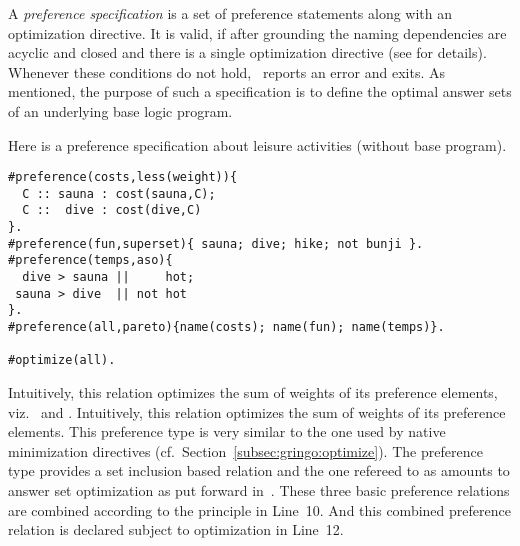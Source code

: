 A \emph{preference specification} is a set of preference statements along with an optimization directive.
It is valid, if after grounding the naming dependencies are acyclic and closed
and there is a single optimization directive
(see \cite{brderosc15a} for details).
Whenever these conditions do not hold, \asprin\ reports an error and exits.
%
As mentioned,
the purpose of such a specification is to define the optimal answer sets of an underlying base logic program.

\begin{example}\label{asprin:example3}
Here is %
a {preference specification} about leisure activities (without base program).
\begin{lstlisting}[escapechar=?]
#preference(costs,less(weight)){ 
  C :: sauna : cost(sauna,C); 
  C ::  dive : cost(dive,C) 
}.
#preference(fun,superset){ sauna; dive; hike; not bunji }.
#preference(temps,aso){
  dive > sauna ||     hot; 
 sauna > dive  || not hot
}.
#preference(all,pareto){name(costs); name(fun); name(temps)}.

#optimize(all).
\end{lstlisting}
Intuitively, this relation optimizes the sum of weights of its preference elements, 
viz.\  and .
Intuitively, this relation optimizes the sum of weights of its preference elements.
This preference type is very similar to the one used by native minimization directives (cf.\ Section~\ref{subsec:gringo:optimize}).
The preference type  provides a set inclusion based relation and the one refereed to as 
amounts to answer set optimization as put forward in~\cite{brnitr03a}.
These three basic preference relations are combined according to the  principle in Line~10.
And this combined preference relation is declared subject to optimization in Line~12.
\end{example}
%

